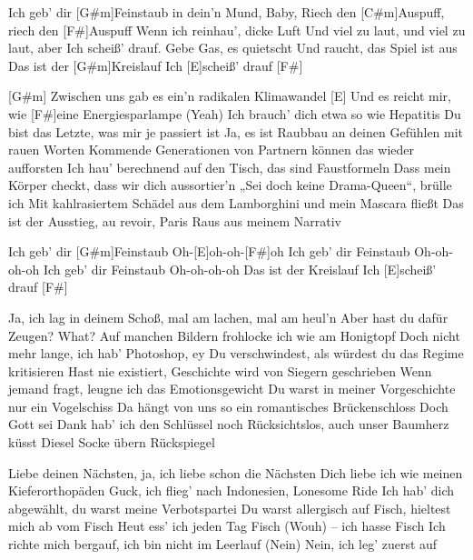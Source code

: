 

\begin{guitar}
	Ich geb' dir [G#m]Feinstaub in dein'n Mund, Baby, 
	Riech den [C#m]Auspuff, riech den [F#]Auspuff
	Wenn ich reinhau', dicke Luft 
	Und viel zu laut, und viel zu laut, aber 
	Ich scheiß' drauf. Gebe Gas, es quietscht
	Und raucht, das Spiel ist aus
	Das ist der [G#m]Kreislauf
	Ich [E]scheiß' drauf [F#]{}
	
	[G#m] Zwischen uns gab es ein'n radikalen Klimawandel
	[E] Und es reicht mir, wie [F#]eine Energiesparlampe (Yeah)
	Ich brauch' dich etwa so wie Hepatitis
	Du bist das Letzte, was mir je passiert ist
	Ja, es ist Raubbau an deinen Gefühlen mit rauen Worten
	Kommende Generationen von Partnern können das wieder aufforsten
	Ich hau' berechnend auf den Tisch, das sind Faustformeln
	Dass mein Körper checkt, dass wir dich aussortier'n
	„Sei doch keine Drama-Queen“, brülle ich 
	Mit kahlrasiertem Schädel aus dem Lamborghini und mein Mascara fließt
	Das ist der Ausstieg, au revoir, Paris
	Raus aus meinem Narrativ
	
	 

	Ich geb' dir [G#m]Feinstaub
	Oh-[E]oh-oh-[F#]oh
	Ich geb' dir Feinstaub
	Oh-oh-oh-oh
	Ich geb' dir Feinstaub
	Oh-oh-oh-oh
	Das ist der Kreislauf
	Ich [E]scheiß' drauf [F#]{}
	
	Ja, ich lag in deinem Schoß, mal am lachen, mal am heul'n
	Aber hast du dafür Zeugen?
	What? Auf manchen Bildern frohlocke ich wie am Honigtopf
	Doch nicht mehr lange, ich hab' Photoshop, ey
	Du verschwindest, als würdest du das Regime kritisieren
	Hast nie existiert, Geschichte wird von Siegern geschrieben
	Wenn jemand fragt, leugne ich das Emotionsgewicht
	Du warst in meiner Vorgeschichte nur ein Vogelschiss
	Da hängt von uns so ein romantisches Brückenschloss
	Doch Gott sei Dank hab' ich den Schlüssel noch
	Rücksichtslos, auch unser Baumherz küsst Diesel
	Socke übern Rückspiegel
	
	 
	
	 
	
	Liebe deinen Nächsten, ja, ich liebe schon die Nächsten
	Dich liebe ich wie meinen Kieferorthopäden
	Guck, ich flieg' nach Indonesien, Lonesome Ride
	Ich hab' dich abgewählt, du warst meine Verbotspartei
	Du warst allergisch auf Fisch, hieltest mich ab vom Fisch
	Heut ess' ich jeden Tag Fisch (Wouh) – ich hasse Fisch
	Ich richte mich bergauf, ich bin nicht im Leerlauf
	(Nein) Nein, ich leg' zuerst auf
	

\end{guitar}
